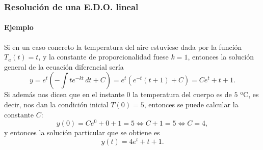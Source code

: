 \begin{frame}
	\frametitle{Resolución de una E.D.O. lineal}
	\framesubtitle{Ejemplo}
	Si en un caso concreto la temperatura del aire estuviese dada por la función $T_a(t)=t$, y la constante de proporcionalidad fuese $k=1$, entonces la solución general de la ecuación diferencial sería
	\[
		y=e^{t}\left(-\int te^{-kt}\,dt+C\right)=e^t(e^{-t}(t+1)+C)=Ce^t+t+1.
	\]
	Si además nos dicen que en el instante $0$ la temperatura del cuerpo es de $5$ ºC, es decir, nos dan la condición inicial $T(0)=5$, entonces
	se puede calcular la constante $C$:
	\[
		y(0)=Ce^0+0+1=5 \Leftrightarrow C+1=5 \Leftrightarrow C=4,
	\]
	y entonces la solución particular que se obtiene es
	\[
		y(t)=4e^t+t+1.
	\]
\end{frame}
